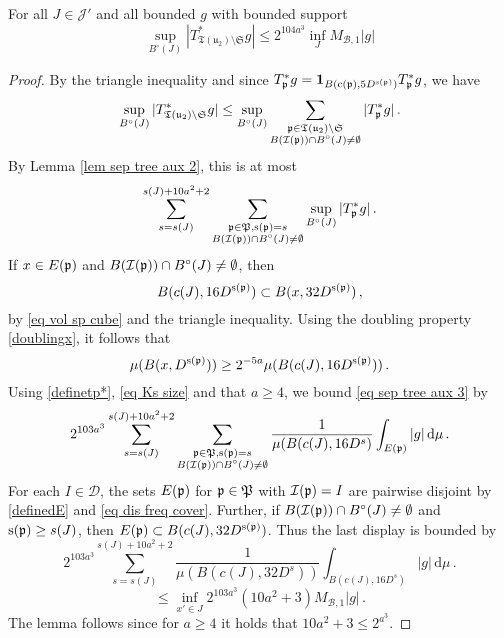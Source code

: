{    \begin{lemma}
        \label{lem sep tree aux 3}
        For all $J \in \mathcal{J}'$ and all bounded $g$ with bounded support
        $$
            \sup_{B^\circ{}(J)} |T_{\mathfrak{T}(\mathfrak{u}_2)\setminus\mathfrak{S}}^* g| \le 2^{104a^3} \inf_J M_{\mathcal{B},1}|g|
        $$
    \end{lemma}

    \begin{proof}
        By the triangle inequality and since $T_{\mathfrak p}^* g = \mathbf{1}_{B(\mathrm{c}(\mathfrak p), 5D^{\mathrm{s}(\mathfrak p)})} T_{\mathfrak p}^* g$, we have
        $$
            \sup_{B^\circ{}(J)} |T_{\mathfrak T(\mathfrak u_2) \setminus\mathfrak{S}}^* g|
            \leq \sup_{B^\circ{}(J)} \sum_{\substack{\mathfrak p \in \mathfrak T(\mathfrak u_2) \setminus \mathfrak{S}\\ B(\mathcal{I}(\mathfrak p)) \cap B^\circ(J)  \ne \emptyset}} |T_{\mathfrak p}^*g|\,.
        $$
        By Lemma \ref{lem sep tree aux 2}, this is at most
        \begin{equation}
            \label{eq sep tree aux 3}
            \sum_{s = s(J)}^{s(J) + 10a^2 + 2} \sum_{\substack{\mathfrak p \in \mathfrak P, \mathrm{s}(\mathfrak p) = s\\ B(\mathcal{I}(\mathfrak p)) \cap B^\circ(J)  \ne \emptyset}} \sup_{B^\circ{}(J)} |T_{\mathfrak p}^* g|\,.
        \end{equation}
        If $x \in E(\mathfrak p)$ and $B(\mathcal{I}(\mathfrak p)) \cap B^\circ(J)  \ne \emptyset$, then
        $$
            B(c(J), 16D^{\mathrm{s}(\mathfrak p)}) \subset B(x, 32 D^{\mathrm{s}(\mathfrak p)})\,,
        $$
        by \eqref{eq vol sp cube} and the triangle inequality. Using the doubling property \eqref{doublingx}, it follows that
        $$
            \mu(B(x, D^{\mathrm{s}(\mathfrak p)})) \ge 2^{-5a} \mu(B(c(J), 16D^{\mathrm{s}(\mathfrak p)}))\,.
        $$
        Using \eqref{definetp*}, \eqref{eq Ks size} and that $a \ge 4$, we bound \eqref{eq sep tree aux 3}  by
        $$
            2^{103a^3}\sum_{s = s(J)}^{s(J) + 10a^2 + 2} \sum_{\substack{\mathfrak p \in \mathfrak P, \mathrm{s}(\mathfrak p) = s\\B(\mathcal{I}(\mathfrak p)) \cap B^\circ(J)  \ne \emptyset}} \frac{1}{\mu(B(c(J), 16 D^s)} \int_{E(\mathfrak p)} |g| \, \mathrm{d}\mu\,.
        $$
        For each $I \in \mathcal{D}$, the sets $E(\mathfrak p)$ for $\mathfrak p \in \mathfrak P$ with $\mathcal{I}(\mathfrak p) = I$ are pairwise disjoint by \eqref{definedE} and \eqref{eq dis freq cover}. Further, if $B(\mathcal{I}(\mathfrak p)) \cap B^\circ(J)  \ne \emptyset$ and $\mathrm{s}(\mathfrak p) \ge s(J)$, then $E(\mathfrak p) \subset B(c(J), 32 D^{\mathrm{s}(\mathfrak p)})$. Thus the last display is bounded by
        $$
            2^{103a^3}\sum_{s = s(J)}^{s(J) + 10a^2 + 2}  \frac{1}{\mu(B(c(J), 32 D^s))} \int_{B(c(J), 16 D^s)} |g| \, \mathrm{d}\mu\,.
        $$
        $$
            \le \inf_{x' \in J} 2^{103a^3}(10a^2 + 3) M_{\mathcal{B}, 1} |g|\,.
        $$
        The lemma follows since for $a \ge 4$ it holds that $10a^2 + 3 \le 2^{a^3}$.
    \end{proof}

}
